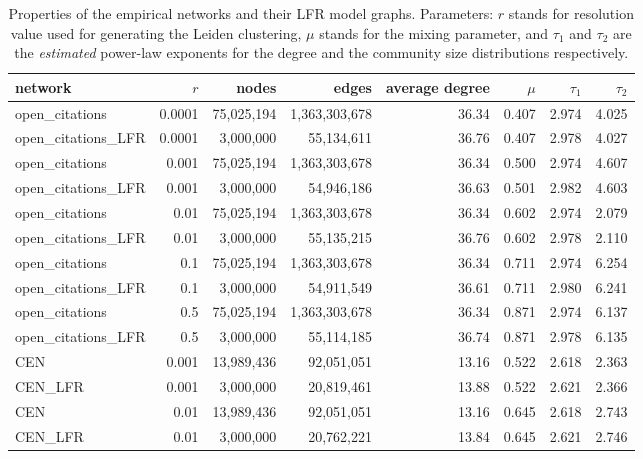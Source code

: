 \documentclass[a4paper]{article}   	%
\begin{document}
\begin{table}[h!]
\caption[Properties of the empirical networks and their LFR model graphs.]{Properties of the empirical networks and their LFR model graphs.  Parameters: $r$ stands for resolution value used for generating the Leiden clustering, $\mu$ stands for the mixing parameter, and $\tau_1$ and $\tau_2$ are the \textit{estimated} power-law exponents for the degree and the community size distributions respectively.}
\centering
\begin{tabular}{lrrrrrrr}
\hline
network              & $r$      & nodes      & edges         & average degree & $\mu$    & $\tau_1$  & $\tau_2$  \\ \hline \hline
open\_citations      & 0.0001 & 75,025,194 & 1,363,303,678 & 36.34    & 0.407 & 2.974 & 4.025 \\
open\_citations\_LFR & 0.0001 & 3,000,000  & 55,134,611    & 36.76    & 0.407 & 2.978 & 4.027 \\\hline
open\_citations      & 0.001  & 75,025,194 & 1,363,303,678 & 36.34    & 0.500 & 2.974 & 4.607 \\
open\_citations\_LFR & 0.001  & 3,000,000  & 54,946,186    & 36.63    & 0.501 & 2.982 & 4.603 \\ \hline
open\_citations      & 0.01   & 75,025,194 & 1,363,303,678 & 36.34    & 0.602 & 2.974 & 2.079 \\
open\_citations\_LFR & 0.01   & 3,000,000  & 55,135,215    & 36.76    & 0.602 & 2.978 & 2.110 \\ \hline
open\_citations      & 0.1    & 75,025,194 & 1,363,303,678 & 36.34    & 0.711 & 2.974 & 6.254 \\
open\_citations\_LFR & 0.1    & 3,000,000  & 54,911,549    & 36.61    & 0.711 & 2.980 & 6.241 \\ \hline
open\_citations      & 0.5    & 75,025,194 & 1,363,303,678 & 36.34    & 0.871 & 2.974 & 6.137 \\
open\_citations\_LFR & 0.5    & 3,000,000  & 55,114,185    & 36.74    & 0.871 & 2.978 & 6.135 \\ \hline\hline
CEN      & 0.001 & 13,989,436 & 92,051,051 & 13.16    & 0.522 & 2.618 & 2.363 \\
CEN\_LFR & 0.001 & 3,000,000  & 20,819,461 & 13.88    & 0.522 & 2.621 & 2.366 \\ \hline
CEN      & 0.01  & 13,989,436 & 92,051,051 & 13.16    & 0.645 & 2.618 & 2.743 \\
CEN\_LFR & 0.01  & 3,000,000  & 20,762,221 & 13.84    & 0.645 & 2.621 & 2.746 \\ \hline

\end{tabular}
\end{table}
\end{document}
